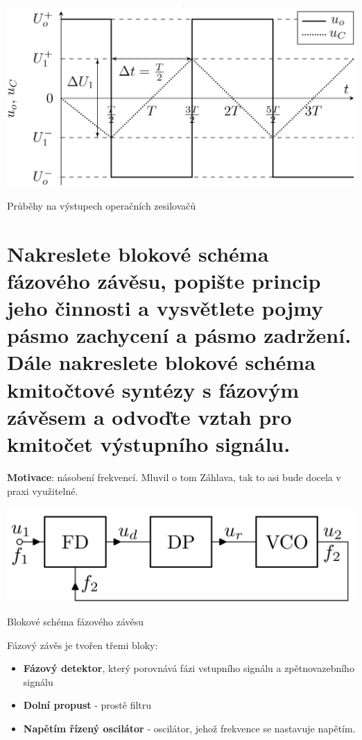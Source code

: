 \documentclass[a4paper,12pt]{article}   %
\begin{document}
\begin{graf}[h!]
    \centering
    \includegraphics[width = .75\textwidth]{gen_funct-graf.PNG}
    \caption{Průběhy na výstupech operačních zesilovačů}
    \label{graf:gen:fci}
\end{graf}









\section{Nakreslete blokové schéma fázového závěsu, popište princip jeho činnosti a vysvětlete pojmy pásmo zachycení a pásmo zadržení. Dále nakreslete blokové schéma kmitočtové syntézy s fázovým závěsem a odvoďte vztah pro kmitočet výstupního signálu.}
\textbf{Motivace}: násobení frekvencí. Mluvil o tom Záhlava, tak to asi bude docela v praxi využitelné.

\begin{schema}[h!]
    \centering
    \includegraphics[width=.6\textwidth]{fazovy_zaves.PNG}
    \caption{Blokové schéma fázového závěsu}
    \label{sch:faz:zaves}
\end{schema}

Fázový závěs je tvořen třemi bloky:
\begin{itemize}
    \item \textbf{Fázový detektor}, který porovnává fázi vstupního signálu a zpětnovazebního signálu
    \item \textbf{Dolní propust} - prostě filtru
    \item \textbf{Napětím řízený oscilátor} - oscilátor, jehož frekvence se nastavuje napětím.
\end{itemize}
\end{document}
